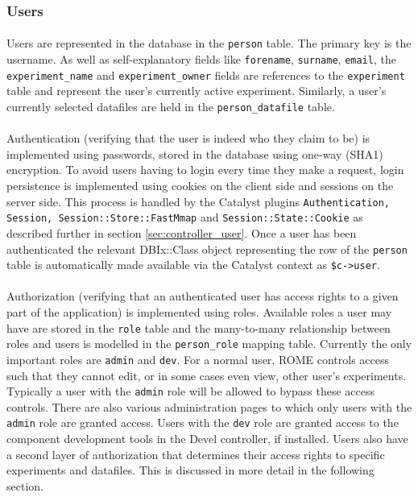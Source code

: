 \subsubsection{Users}
\label{sec:model_users}

\paragraph{}
Users are represented in the database in the \texttt{person} table. The primary key is the username. As well as self-explanatory fields like \texttt{forename}, \texttt{surname}, \texttt{email}, the \texttt{experiment\_name} and \texttt{experiment\_owner} fields are references to the \texttt{experiment} table and represent the user's currently active experiment. Similarly, a user's currently selected datafiles are held in the \texttt{person\_datafile} table.

\paragraph{}
Authentication (verifying that the user is indeed who they claim to be) is implemented using passwords, stored in the database using one-way (SHA1) encryption. To avoid users having to login every time they make a request, login persistence is implemented using cookies on the client side and sessions on the server side. This process is handled by the Catalyst plugins \texttt{Authentication, Session, Session::Store::FastMmap} and \texttt{Session::State::Cookie} as described further in section \ref{sec:controller_user}. Once a user has been authenticated the relevant DBIx::Class object representing the row of the \texttt{person} table is automatically made available via the Catalyst context as \texttt{\$c->user}.

\paragraph{}
Authorization (verifying that an authenticated user has access rights to a given part of the application) is implemented using roles. Available roles a user may have are stored in the \texttt{role} table and the many-to-many relationship between roles and users is modelled in the \texttt{person\_role} mapping table. Currently the only important roles are \texttt{admin} and \texttt{dev}. For a normal user, ROME controls access such that they cannot edit, or in some cases even view, other user's experiments. Typically a user with the \texttt{admin} role will be allowed to bypass these access controls. There are also various administration pages to which only users with the \texttt{admin} role are granted access. Users with the \texttt{dev} role are granted access to the component development tools in the Devel controller, if installed. Users also have a second layer of authorization that determines their access rights to specific experiments and  datafiles. This is discussed in more detail in the following section.



